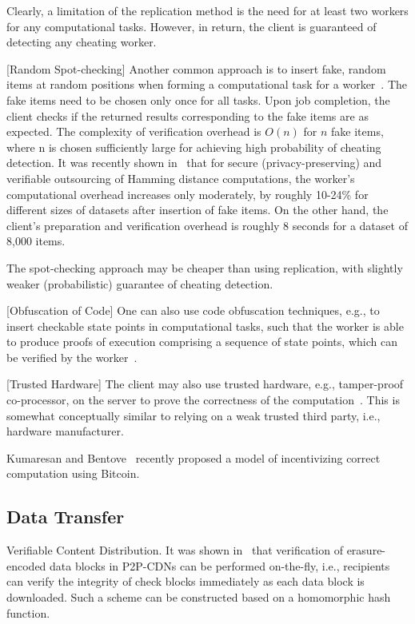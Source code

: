 Clearly, a limitation of the replication method is the need for at least two workers for any computational tasks. However, in return, the client is guaranteed of detecting any cheating worker.

[Random Spot-checking]
Another common approach is to insert fake, random items at random positions when forming a computational task for a worker~\cite{GM01,JK07}. The fake items need to be chosen only once for all tasks. Upon job completion, the client checks if the returned results corresponding to the fake items are as expected. The complexity of verification overhead is $O(n)$ for $n$ fake items, where n is chosen sufficiently large for achieving high probability of cheating detection. It was recently shown in~\cite{BZF13} that for secure (privacy-preserving) and verifiable outsourcing of Hamming distance computations, the worker's computational overhead increases only moderately, by roughly 10-24\% for different sizes of datasets after insertion of fake items. On the other hand, the client's preparation and verification overhead is roughly 8 seconds for a dataset of 8,000 items.

The spot-checking approach may be cheaper than using replication, with slightly weaker (probabilistic) guarantee of cheating detection.

[Obfuscation of Code]
One can also use code obfuscation techniques, e.g., to insert checkable state points in computational tasks, such that the worker is able to produce proofs of execution comprising a sequence of state points, which can be verified by the worker~\cite{Hoh98, MWR99}.

[Trusted Hardware]
The client may also use trusted hardware, e.g., tamper-proof co-processor, on the server to prove the correctness of the computation~\cite{SPD05}. This is somewhat conceptually similar to relying on a weak trusted third party, i.e., hardware manufacturer.

Kumaresan and Bentove~\cite{KB14} recently proposed a model of incentivizing correct computation using Bitcoin. 


\subsection{Data Transfer}

Verifiable Content Distribution. It was shown in~\cite{KFM04} that verification of erasure-encoded data blocks in P2P-CDNs can be performed on-the-fly, i.e., recipients can verify the integrity of check blocks immediately as each data block is downloaded. Such a scheme can be constructed based on a homomorphic hash function.

